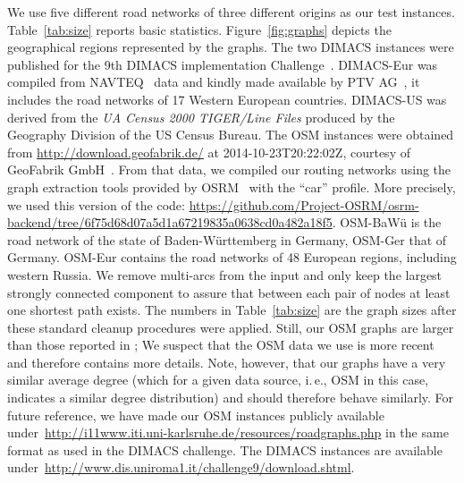 \documentclass{sig-alternate}
\newcommand{\ie}{i.\,e.\xspace}
\begin{document}
We use five different road networks of three different origins as our test instances. Table~\ref{tab:size} reports basic statistics. Figure~\ref{fig:graphs} depicts the geographical regions represented by the graphs.
The two DIMACS instances were published for the 9th DIMACS implementation Challenge~\cite{dgj-spndi-09}. 
DIMACS-Eur was compiled from NAVTEQ~\cite{navteq} data and kindly made available by PTV AG~\cite{ptv}, it includes the road networks of 17 Western European countries. 
DIMACS-US was derived from the \emph{UA Census 2000 TIGER/Line Files} produced by the Geography Division of the US Census Bureau.
The OSM instances were obtained from \url{http://download.geofabrik.de/} at 2014-10-23T20:22:02Z, courtesy of GeoFabrik GmbH~\cite{geofabrik}. From that data, we compiled our routing networks using the graph extraction tools provided by OSRM~\cite{luxen-vetter-2011} with the ``car'' profile. More precisely, we used this version of the code: \url{https://github.com/Project-OSRM/osrm-backend/tree/6f75d68d07a5d1a67219835a0638cd0a482a18f5}. 
OSM-BaWü is the road network of the state of Baden-Württemberg in Germany, OSM-Ger that of Germany.
OSM-Eur contains the road networks of 48 European regions, including western Russia.
We remove multi-arcs from the input and only keep the
largest strongly connected component to assure that between each pair
of nodes at least one shortest path exists. The numbers in Table~\ref{tab:size}
are the graph sizes after these standard cleanup procedures were applied.
Still, our OSM graphs are larger than those reported in \cite{fns-opca-14}; 
We suspect that the OSM data we use is more recent and therefore contains
more details. Note, however, that our graphs have a very similar average degree (which for a given data source, \ie, OSM in this case, indicates a similar degree distribution) and should therefore behave similarly. For future reference, we have made our OSM instances publicly available under~\url{http://i11www.iti.uni-karlsruhe.de/resources/roadgraphs.php} in the same format as used in the DIMACS challenge. The DIMACS instances are available under~\url{http://www.dis.uniroma1.it/challenge9/download.shtml}. 
 
\end{document}
